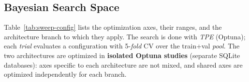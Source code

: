 \documentclass[10pt,a4paper,twocolumn,twoside]{article}
\begin{document}
%
%
%
%
%
%
\newpage

\subsection{Bayesian Search Space}
\label{app:sweep-config}

Table~\ref{tab:sweep-config} lists the optimization axes, their ranges, and the architecture
branch to which they apply. The search is done with \textit{TPE} (Optuna); each \textit{trial} evaluates
a configuration with 5-\textit{fold} CV over the train+val \textit{pool}. The two architectures
are optimized in \textbf{isolated Optuna studies} (separate SQLite databases): axes specific to each
architecture are not mixed, and shared axes are optimized independently for each branch.
\end{document}
